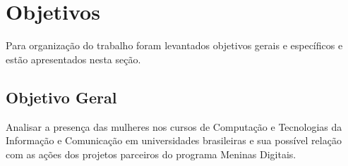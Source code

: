 

\section{Objetivos}\label{sec:Objetivos}

Para organização do trabalho foram levantados objetivos gerais e específicos e estão apresentados nesta seção.

\subsection{Objetivo Geral}\label{sec:ObjGeral}
Analisar a presença das mulheres nos cursos de Computação e Tecnologias da Informação e Comunicação em universidades brasileiras e sua possível relação com as ações dos projetos parceiros do programa Meninas Digitais.


